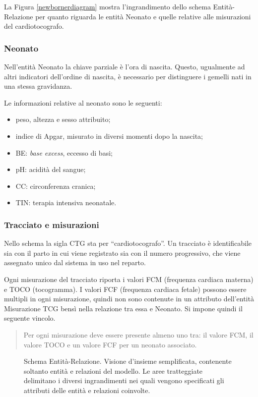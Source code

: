 La Figura \ref{newbornerdiagram} mostra l'ingrandimento dello schema Entità-Relazione per quanto riguarda le entità Neonato e quelle relative alle misurazioni del cardiotocografo.

\subsubsection{Neonato}

Nell'entità Neonato la chiave parziale è l'ora di nascita.
Questo, ugualmente ad altri indicatori dell'ordine di nascita, è necessario per distinguere i gemelli nati in una stessa gravidanza.

Le informazioni relative al neonato sono le seguenti:
\begin{itemize}
\item peso, altezza e sesso attribuito;
\item indice di Apgar, misurato in diversi momenti dopo la nascita;
\item BE: \emph{base excess}, eccesso di basi;
\item pH: acidità del sangue;
\item CC: circonferenza cranica;
\item TIN: terapia intensiva neonatale.
\end{itemize}

\subsubsection{Tracciato e misurazioni}

Nello schema la sigla CTG sta per \enquote{cardiotocografo}.
Un tracciato è identificabile sia con il parto in cui viene registrato sia con il numero progressivo, che viene assegnato unico dal sistema in uso nel reparto.

Ogni misurazione del tracciato riporta i valori FCM (frequenza cardiaca materna) e TOCO (tocogramma).
I valori FCF (frequenza cardiaca fetale) possono essere multipli in ogni misurazione, quindi non sono contenute in un attributo dell'entità Misurazione TCG bensì nella relazione tra essa e Neonato.
Si impone quindi il seguente vincolo.
\begin{quote}
Per ogni misurazione deve essere presente almeno uno tra: il valore FCM, il valore TOCO e un valore FCF per un neonato associato.
\end{quote}

\begin{figure}
    \centering
    
    \caption{Schema Entità-Relazione. Visione d'insieme semplificata, contenente soltanto entità e relazioni del modello. Le aree tratteggiate delimitano i diversi ingrandimenti nei quali vengono specificati gli attributi delle entità e relazioni coinvolte.}
    \label{completeerdiagram}
\end{figure}

